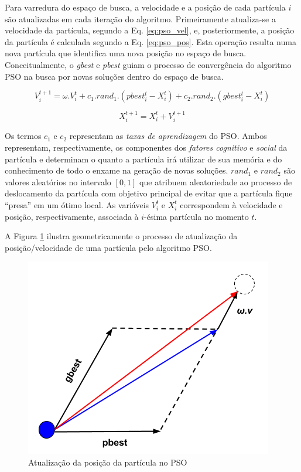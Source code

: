 \documentclass[
	12pt,				%
	openany,			%
	oneside,	
	a4paper,			%
	brazil,				%
	]{unimontes-ppgmsc-abntex2}
\begin{document}
Para varredura do espaço de busca, a velocidade e a posição de cada partícula $i$ são atualizadas em cada iteração do algoritmo. Primeiramente atualiza-se a velocidade da partícula, segundo a Eq. \ref{eq:pso_vel}, e, posteriormente, a posição da partícula é calculada segundo a Eq. \ref{eq:pso_pos}. Esta operação resulta numa nova partícula que identifica uma nova posição no espaço de busca. Conceitualmente, o {\em gbest} e {\em pbest} guiam o processo de convergência do algoritmo PSO na busca por novas soluções dentro do espaço de busca. 

\begin{equation}
\label{eq:pso_vel}
V^{t+1}_{i} = \omega . V^{t}_{i} + c_1 . rand_1 . (pbest^{t}_{i} - X^{t}_{i}) + c_2 . rand_2 . (gbest^{t}_{i} - X^{t}_{i})
\end{equation}

\begin{equation}
\label{eq:pso_pos}
X^{t+1}_{i} = X^{t}_{i} + V^{t+1}_{i}
\end{equation}

Os termos $c_1$ e $c_2$ representam as {\em taxas de aprendizagem} do PSO. Ambos representam, respectivamente, os componentes dos {\em fatores cognitivo} e {\em social} da partícula e determinam o quanto a partícula irá utilizar de sua memória e do conhecimento de todo o enxame na geração de novas soluções. $rand_1$ e $rand_2$ são valores aleatórios no intervalo $[0,1]$ que atribuem aleatoriedade ao processo de deslocamento da partícula com objetivo principal de evitar que a partícula fique ``presa'' em um ótimo local. As variáveis $V^{t}_{i}$ e $X^{t}_{i}$ correspondem à velocidade e posição, respectivamente, associada à $i$-ésima partícula no momento $t$.

A Figura \ref{fig:nova_part} ilustra geometricamente o processo de atualização da posição/velocidade de uma partícula pelo algoritmo PSO.

\begin{figure}[ht]
\label{fig:nova_part}
\centering
\includegraphics[scale=.5]{img/nova_part}
\caption{Atualização da posição da partícula no PSO}
\end{figure}
\end{document}

